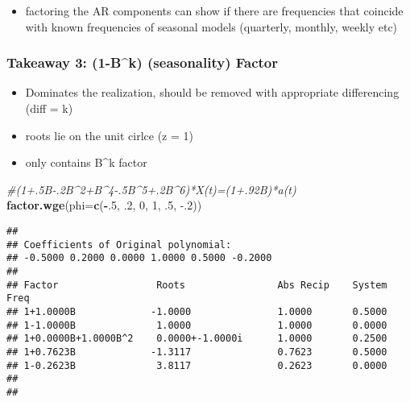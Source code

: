 \documentclass[
]{article}
\newenvironment{Shaded}{\begin{snugshade}}{\end{snugshade}}
\newcommand{\CommentTok}[1]{\textcolor[rgb]{0.56,0.35,0.01}{\textit{#1}}}
\newcommand{\DataTypeTok}[1]{\textcolor[rgb]{0.13,0.29,0.53}{#1}}
\newcommand{\DecValTok}[1]{\textcolor[rgb]{0.00,0.00,0.81}{#1}}
\newcommand{\FloatTok}[1]{\textcolor[rgb]{0.00,0.00,0.81}{#1}}
\newcommand{\KeywordTok}[1]{\textcolor[rgb]{0.13,0.29,0.53}{\textbf{#1}}}
\newcommand{\NormalTok}[1]{#1}
\newcommand{\OperatorTok}[1]{\textcolor[rgb]{0.81,0.36,0.00}{\textbf{#1}}}
\providecommand{\tightlist}{%
  \setlength{\itemsep}{0pt}\setlength{\parskip}{0pt}}
\begin{document}
\begin{itemize}
\tightlist
\item
  factoring the AR components can show if there are frequencies that
  coincide with known frequencies of seasonal models (quarterly,
  monthly, weekly etc)
\end{itemize}

\hypertarget{takeaway-3-1-bk-seasonality-factor}{%
\subsubsection{Takeaway 3: (1-B\^{}k) (seasonality)
Factor}\label{takeaway-3-1-bk-seasonality-factor}}

\begin{itemize}
\tightlist
\item
  Dominates the realization, should be removed with appropriate
  differencing (diff = k)
\item
  roots lie on the unit cirlce (z = 1)
\item
  only contains B\^{}k factor
\end{itemize}

\begin{Shaded}
\begin{Highlighting}[]
\CommentTok{#(1+.5B-.2B^2+B^4-.5B^5+.2B^6)*X(t)=(1+.92B)*a(t)}
\KeywordTok{factor.wge}\NormalTok{(}\DataTypeTok{phi=}\KeywordTok{c}\NormalTok{(}\OperatorTok{-}\NormalTok{.}\DecValTok{5}\NormalTok{, }\FloatTok{.2}\NormalTok{, }\DecValTok{0}\NormalTok{, }\DecValTok{1}\NormalTok{, }\FloatTok{.5}\NormalTok{, }\FloatTok{-.2}\NormalTok{))}
\end{Highlighting}
\end{Shaded}

\begin{verbatim}
## 
## Coefficients of Original polynomial:  
## -0.5000 0.2000 0.0000 1.0000 0.5000 -0.2000 
## 
## Factor                 Roots                Abs Recip    System Freq 
## 1+1.0000B             -1.0000               1.0000       0.5000
## 1-1.0000B              1.0000               1.0000       0.0000
## 1+0.0000B+1.0000B^2    0.0000+-1.0000i      1.0000       0.2500
## 1+0.7623B             -1.3117               0.7623       0.5000
## 1-0.2623B              3.8117               0.2623       0.0000
##   
## 
\end{verbatim}
\end{document}
